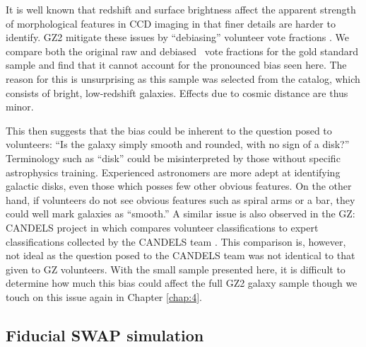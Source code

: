 It is well known that redshift and surface brightness affect the apparent strength of morphological features in CCD imaging in that finer details are harder to identify. GZ2 mitigate these issues by ``debiasing'' volunteer vote fractions \citep{Willett2013}. We compare both the original raw and debiased \fsmooth~vote fractions for the gold standard sample and find that it cannot account for the pronounced bias seen here. The reason for this is unsurprising as this sample was selected from the \cite{NairAbraham2010} catalog, which consists of bright, low-redshift galaxies. Effects due to cosmic distance are thus minor. 

This then suggests that the bias could be inherent to the question posed to volunteers: ``Is the galaxy simply smooth and rounded, with no sign of a disk?'' Terminology such as ``disk'' could be misinterpreted by those without specific astrophysics training. Experienced astronomers are more adept at identifying galactic disks, even those which posses few other obvious features. On the other hand, if volunteers do not see obvious features such as spiral arms or a bar, they could well mark galaxies as ``smooth.''  A similar issue is also observed in the GZ: CANDELS project in which \cite{Simmons2017} compares volunteer classifications to expert classifications collected by the CANDELS team \citep{Kartaltepe2015}. This comparison is, however, not ideal as the question posed to the CANDELS team was not identical to that given to GZ volunteers. With the small sample presented here, it is difficult to determine how much this bias could affect the full GZ2 galaxy sample though we touch on this issue again in Chapter \ref{chap:4}. 



\subsection{Fiducial SWAP simulation}\label{sec: fiducial}

